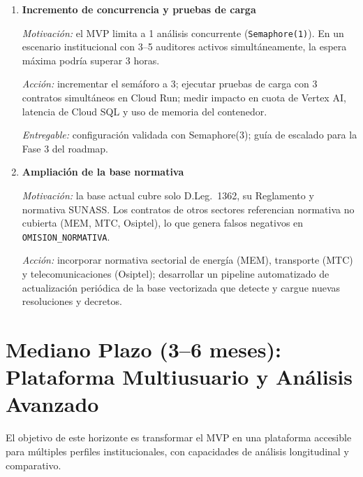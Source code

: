 \begin{enumerate}
    \textit{Acción:} reenviar solicitud de cuota a Vertex AI con
    justificación técnica detallada y caso de uso institucional; una vez
    aprobada, ejecutar benchmark completo sobre el Contrato A
    con Claude Sonnet~4.6 y Opus~4.6 bajo el mismo protocolo de evaluación.

    \textit{Entregable:} tabla comparativa de 4 modelos (Gemini~2.5~Pro,
    Gemini~3.1~Preview, Claude~Sonnet~4.6, Claude~Opus~4.6) en hallazgos,
    precisión, recall, latencia y costo.

    \item \textbf{Incremento de concurrencia y pruebas de carga}

    \textit{Motivación:} el MVP limita a 1 análisis concurrente
    (\texttt{Semaphore(1)}). En un escenario institucional con 3--5 auditores
    activos simultáneamente, la espera máxima podría superar 3 horas.

    \textit{Acción:} incrementar el semáforo a 3; ejecutar pruebas de carga
    con 3 contratos simultáneos en Cloud Run; medir impacto en cuota
    de Vertex AI, latencia de Cloud SQL y uso de memoria del contenedor.

    \textit{Entregable:} configuración validada con Semaphore(3); guía de
    escalado para la Fase 3 del roadmap.

    \item \textbf{Ampliación de la base normativa}

    \textit{Motivación:} la base actual cubre solo D.Leg.\ 1362, su
    Reglamento y normativa SUNASS. Los contratos de otros sectores
    referencian normativa no cubierta (MEM, MTC, Osiptel), lo que genera
    falsos negativos en \texttt{OMISION\_NORMATIVA}.

    \textit{Acción:} incorporar normativa sectorial de energía (MEM),
    transporte (MTC) y telecomunicaciones (Osiptel); desarrollar un
    pipeline automatizado de actualización periódica de la base vectorizada
    que detecte y cargue nuevas resoluciones y decretos.

\end{enumerate}

\section*{Mediano Plazo (3--6 meses): Plataforma Multiusuario y Análisis Avanzado}

El objetivo de este horizonte es transformar el MVP en una plataforma
accesible para múltiples perfiles institucionales, con capacidades de
análisis longitudinal y comparativo.

